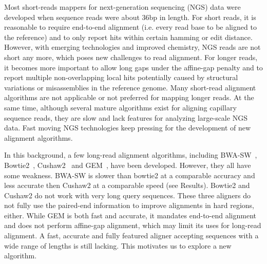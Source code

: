 \documentclass{bioinfo}
\begin{document}
Most short-reads mappers for next-generation sequencing (NGS) data were
developed when sequence reads were about 36bp in length. For short reads, it is
reasonable to require end-to-end alignment (i.e. every read base to be aligned
to the reference) and to only report hits within certain hamming or edit
distance.  However, with emerging technologies and improved chemistry, NGS
reads are not short any more, which poses new challenges to read alignment. For
longer reads, it becomes more important to allow long gaps under the affine-gap
penalty and to report multiple non-overlapping local hits potentially caused by
structural variations or misassemblies in the reference genome. Many short-read
alignment algorithms are not applicable or not preferred for mapping longer
reads. At the same time, although several mature algorithms exist for aligning
capillary sequence reads, they are slow and lack features for analyzing
large-scale NGS data. Fast moving NGS technologies keep pressing for the
development of new alignment algorithms.

In this background, a few long-read alignment algorithms, including
BWA-SW~\citep{Li:2010fk}, Bowtie2~\citep{Langmead:2012fk},
Cushaw2~\citep{Liu:2012uq} and GEM~\citep{Marco-Sola:2012kx}, have been
developed. However, they all have some weakness. BWA-SW is slower than bowtie2
at a comparable accuracy and less accurate then Cushaw2 at a comparable speed
(see Results). Bowtie2 and Cushaw2 do not work with very long query sequences.
These three aligners do not fully use the paired-end information to improve
alignments in hard regions, either.  While GEM is both fast and accurate, it
mandates end-to-end alignment and does not perform affine-gap alignment, which
may limit its uses for long-read alignment. A fast, accurate and fully featured
aligner accepting sequences with a wide range of lengths is still lacking. This
motivates us to explore a new algorithm.
\end{document}
